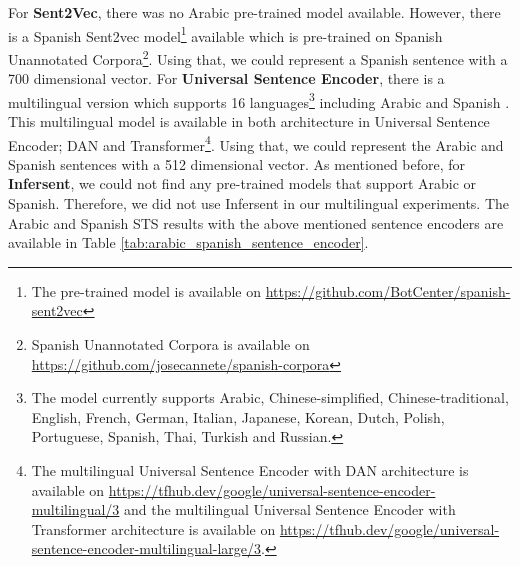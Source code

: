 For \textbf{Sent2Vec}, there was no Arabic pre-trained model available. However, there is a Spanish Sent2vec model\footnote{The pre-trained model is available on \url{https://github.com/BotCenter/spanish-sent2vec}} available which is pre-trained on Spanish Unannotated Corpora\footnote{Spanish Unannotated Corpora is available on \url{https://github.com/josecannete/spanish-corpora}}. Using that, we could represent a Spanish sentence with a 700 dimensional vector. For \textbf{Universal Sentence Encoder}, there is a multilingual version which supports 16 languages\footnote{The model currently supports Arabic, Chinese-simplified, Chinese-traditional, English, French, German, Italian, Japanese, Korean, Dutch, Polish, Portuguese, Spanish, Thai, Turkish and Russian.} including Arabic and Spanish \autocite{yang-etal-2020-multilingual}. This multilingual model is available in both architecture in Universal Sentence Encoder; DAN and Transformer\footnote{The multilingual Universal Sentence Encoder with DAN architecture is available on \url{https://tfhub.dev/google/universal-sentence-encoder-multilingual/3} and the multilingual Universal Sentence Encoder with Transformer architecture is available on \url{https://tfhub.dev/google/universal-sentence-encoder-multilingual-large/3}.}. Using that, we could represent the Arabic and Spanish sentences with a 512 dimensional vector. As mentioned before, for \textbf{Infersent}, we could not find any pre-trained models that support Arabic or Spanish. Therefore, we did not use Infersent in our multilingual experiments. The Arabic and Spanish STS results with the above mentioned sentence encoders are available in Table \ref{tab:arabic_spanish_sentence_encoder}.

